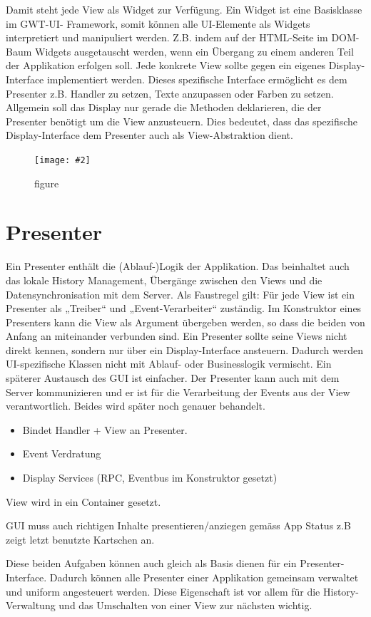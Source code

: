 \documentclass[a4paper,10pt]{scrreprt}
\newcommand{\pic}[2][figure]{\begin{figure}[h]
 \centering
 \texttt{[image: \#2]}
 \caption{#1}
\end{figure}
}
\begin{document}
Damit steht jede View als Widget zur Verfügung. Ein Widget ist eine Basisklasse im GWT-UI-
Framework, somit können alle UI-Elemente als Widgets interpretiert und manipuliert werden. Z.B.
indem auf der HTML-Seite im DOM-Baum Widgets ausgetauscht werden, wenn ein Übergang zu einem
anderen Teil der Applikation erfolgen soll.
Jede konkrete View sollte gegen ein eigenes Display-Interface implementiert werden. Dieses
spezifische Interface ermöglicht es dem Presenter z.B. Handler zu setzen, Texte anzupassen oder
Farben zu setzen. Allgemein soll das Display nur gerade die Methoden deklarieren, die der Presenter
benötigt um die View anzusteuern. Dies bedeutet, dass das spezifische Display-Interface dem
Presenter auch als View-Abstraktion dient.
\pic{iswidget.png}

\section{Presenter}
Ein Presenter enthält die (Ablauf-)Logik der Applikation. Das beinhaltet auch das lokale History
Management, Übergänge zwischen den Views und die Datensynchronisation mit dem Server. Als
Faustregel gilt: Für jede View ist ein Presenter als „Treiber“ und „Event-Verarbeiter“ zuständig. Im
Konstruktor eines Presenters kann die View als Argument übergeben werden, so dass die beiden von
Anfang an miteinander verbunden sind. Ein Presenter sollte seine Views nicht direkt kennen, sondern
nur über ein Display-Interface ansteuern. Dadurch werden UI-spezifische Klassen nicht mit Ablauf-
oder Businesslogik vermischt. Ein späterer Austausch des GUI ist einfacher.
Der Presenter kann auch mit dem Server kommunizieren und er ist für die Verarbeitung der Events aus
der View verantwortlich. Beides wird später noch genauer behandelt.
\begin{description}
 \item [Bind] \begin{itemize}
               \item Bindet Handler + View an Presenter.
               \item Event Verdratung
               \item Display Services (RPC, Eventbus im Konstruktor gesetzt)
              \end{itemize}
\item[Present] View wird in ein Container gesetzt.
\item GUI muss auch richtigen Inhalte presentieren/anziegen gemäss App Status z.B zeigt letzt benutzte Kartschen an.

\end{description}
Diese beiden Aufgaben können auch gleich als Basis dienen für ein Presenter-Interface. Dadurch
können alle Presenter einer Applikation gemeinsam verwaltet und uniform angesteuert werden. Diese
Eigenschaft ist vor allem für die History-Verwaltung und das Umschalten von einer View zur nächsten
wichtig.
\end{document}
